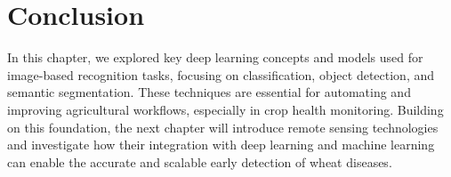 



\section{Conclusion}
In this chapter, we explored key deep learning concepts and models used for image-based recognition tasks, focusing on classification, object detection, and semantic segmentation. These techniques are essential for automating and improving agricultural workflows, especially in crop health monitoring. Building on this foundation, the next chapter will introduce remote sensing technologies and investigate how their integration with deep learning and machine learning can enable the accurate and scalable early detection of wheat diseases.